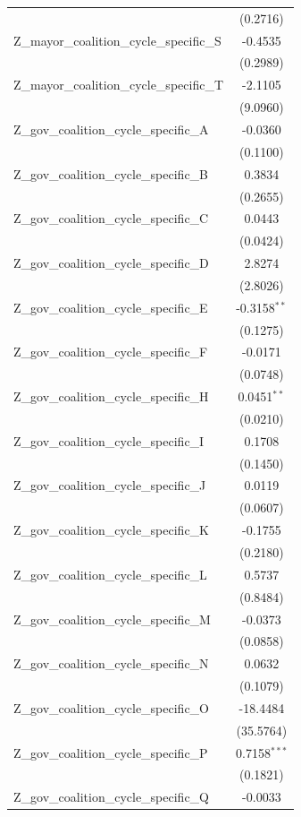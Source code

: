 \begin{tabular}{lc}
 & (0.2716) \\
Z\_mayor\_coalition\_cycle\_specific\_S & -0.4535 \\
 & (0.2989) \\
Z\_mayor\_coalition\_cycle\_specific\_T & -2.1105 \\
 & (9.0960) \\
Z\_gov\_coalition\_cycle\_specific\_A & -0.0360 \\
 & (0.1100) \\
Z\_gov\_coalition\_cycle\_specific\_B & 0.3834 \\
 & (0.2655) \\
Z\_gov\_coalition\_cycle\_specific\_C & 0.0443 \\
 & (0.0424) \\
Z\_gov\_coalition\_cycle\_specific\_D & 2.8274 \\
 & (2.8026) \\
Z\_gov\_coalition\_cycle\_specific\_E & -0.3158$^{**}$ \\
 & (0.1275) \\
Z\_gov\_coalition\_cycle\_specific\_F & -0.0171 \\
 & (0.0748) \\
Z\_gov\_coalition\_cycle\_specific\_H & 0.0451$^{**}$ \\
 & (0.0210) \\
Z\_gov\_coalition\_cycle\_specific\_I & 0.1708 \\
 & (0.1450) \\
Z\_gov\_coalition\_cycle\_specific\_J & 0.0119 \\
 & (0.0607) \\
Z\_gov\_coalition\_cycle\_specific\_K & -0.1755 \\
 & (0.2180) \\
Z\_gov\_coalition\_cycle\_specific\_L & 0.5737 \\
 & (0.8484) \\
Z\_gov\_coalition\_cycle\_specific\_M & -0.0373 \\
 & (0.0858) \\
Z\_gov\_coalition\_cycle\_specific\_N & 0.0632 \\
 & (0.1079) \\
Z\_gov\_coalition\_cycle\_specific\_O & -18.4484 \\
 & (35.5764) \\
Z\_gov\_coalition\_cycle\_specific\_P & 0.7158$^{***}$ \\
 & (0.1821) \\
Z\_gov\_coalition\_cycle\_specific\_Q & -0.0033 \\

\end{tabular}
